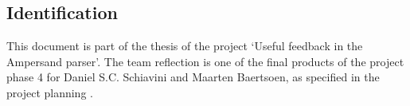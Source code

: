 
\subsection{Identification}
This document is part of the thesis of the project `Useful feedback in the Ampersand parser'.
The team reflection is one of the final products of the project phase 4 for Daniel S.C. Schiavini and Maarten Baertsoen, as specified in the project planning \cite{plan}.
